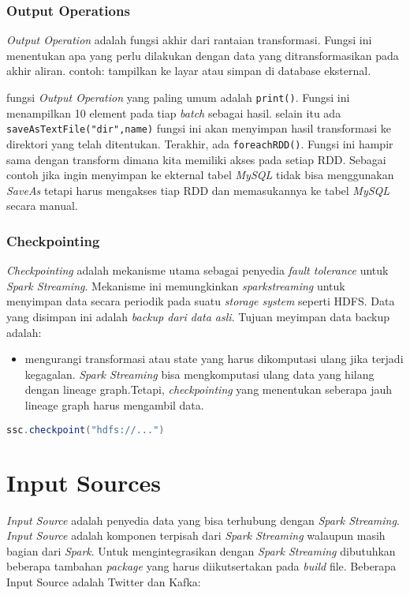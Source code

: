 \subsubsection{Output Operations}
\textit{Output Operation} adalah fungsi akhir dari rantaian transformasi. Fungsi ini menentukan apa yang perlu dilakukan dengan data yang ditransformasikan pada akhir aliran. contoh: tampilkan ke layar atau simpan di database eksternal.

fungsi \textit{Output Operation} yang paling umum adalah \texttt{print()}. Fungsi ini menampilkan
10 element pada tiap \textit{batch} sebagai hasil. selain itu ada \texttt{saveAsTextFile("dir",name)} fungsi ini akan menyimpan hasil transformasi ke direktori yang telah ditentukan. Terakhir, ada \texttt{foreachRDD()}. Fungsi ini hampir sama dengan transform dimana kita memiliki akses pada setiap RDD. Sebagai contoh jika ingin menyimpan ke ekternal tabel \textit{MySQL} tidak bisa menggunakan \textit{SaveAs} tetapi harus mengakses tiap RDD dan memasukannya ke tabel \textit{MySQL} secara manual.
 
\subsubsection{Checkpointing}
\textit{Checkpointing} adalah mekanisme utama sebagai penyedia \textit{fault tolerance} untuk \textit{Spark Streaming}. Mekanisme ini memungkinkan \textit{sparkstreaming} untuk menyimpan data
secara periodik pada suatu \textit{storage system} seperti HDFS. Data yang disimpan ini adalah \textit{backup dari data asli}. Tujuan meyimpan data backup adalah:

\begin{itemize}
	\item mengurangi transformasi atau state yang harus dikomputasi ulang jika terjadi kegagalan.
	\textit{Spark Streaming} bisa mengkomputasi ulang data yang hilang dengan lineage graph.Tetapi,
	\textit{checkpointing} yang menentukan seberapa jauh lineage graph harus mengambil data. 
\end{itemize}

\begin{lstlisting}[language=Scala, caption= contoh checkpointing]
	ssc.checkpoint("hdfs://...")
\end{lstlisting}


\section{Input Sources}
\textit{Input Source} adalah penyedia data yang bisa terhubung dengan \textit{Spark Streaming}. \textit{Input Source} adalah komponen terpisah dari \textit{Spark Streaming} walaupun masih bagian dari \textit{Spark}. Untuk mengintegrasikan dengan \textit{Spark Streaming} dibutuhkan beberapa tambahan \textit{package} yang harus diikutsertakan pada \textit{build} file. Beberapa Input Source
adalah Twitter dan Kafka:

